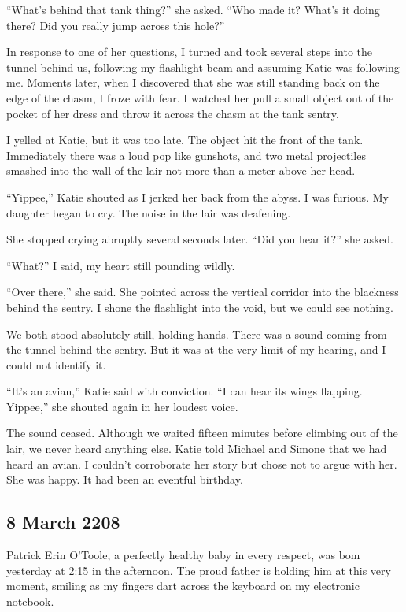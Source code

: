 \documentclass[]{article}
\begin{document}
“What’s behind that tank thing?” she asked.  “Who made it? What’s it doing there? Did you really jump across this hole?”

In response to one of her questions, I turned and took several steps into the tunnel behind us, following my flashlight beam and assuming Katie was following me.  Moments later, when I discovered that she was still standing back on the edge of the chasm, I froze with fear.  I watched her pull a small object out of the pocket of her dress and throw it across the chasm at the tank sentry.

I yelled at Katie, but it was too late.  The object hit the front of the tank.  Immediately there was a loud pop like gunshots, and two metal projectiles smashed into the wall of the lair not more than a meter above her head.

“Yippee,” Katie shouted as I jerked her back from the abyss.  I was furious.  My daughter began to cry.  The noise in the lair was deafening.

She stopped crying abruptly several seconds later.  “Did you hear it?” she asked.

“What?” I said, my heart still pounding wildly.

“Over there,” she said.  She pointed across the vertical corridor into the blackness behind the sentry.  I shone the flashlight into the void, but we could see nothing.

We both stood absolutely still, holding hands.  There was a sound coming from the tunnel behind the sentry.  But it was at the very limit of my hearing, and I could not identify it.

“It’s an avian,” Katie said with conviction.  “I can hear its wings flapping.  Yippee,” she shouted again in her loudest voice.

The sound ceased.  Although we waited fifteen minutes before climbing out of the lair, we never heard anything else.  Katie told Michael and Simone that we had heard an avian.  I couldn’t corroborate her story but chose not to argue with her.  She was happy.  It had been an eventful birthday.

\subsection*{8 March 2208}

Patrick Erin O’Toole, a perfectly healthy baby in every respect, was bom yesterday at 2:15 in the afternoon.  The proud father is holding him at this very moment, smiling as my fingers dart across the keyboard on my electronic notebook.
\end{document}

